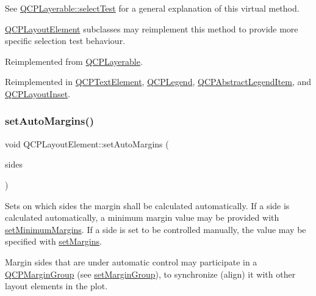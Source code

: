 See \mbox{\hyperlink{class_q_c_p_layerable_a04db8351fefd44cfdb77958e75c6288e}{Q\+C\+P\+Layerable\+::select\+Test}} for a general explanation of this virtual method.

\mbox{\hyperlink{class_q_c_p_layout_element}{Q\+C\+P\+Layout\+Element}} subclasses may reimplement this method to provide more specific selection test behaviour. 

Reimplemented from \mbox{\hyperlink{class_q_c_p_layerable_a04db8351fefd44cfdb77958e75c6288e}{Q\+C\+P\+Layerable}}.



Reimplemented in \mbox{\hyperlink{class_q_c_p_text_element_a1e721bc2994a127ef5a8f0a514a5dbac}{Q\+C\+P\+Text\+Element}}, \mbox{\hyperlink{class_q_c_p_legend_aa53507624491908fb3d1a514b1fc674e}{Q\+C\+P\+Legend}}, \mbox{\hyperlink{class_q_c_p_abstract_legend_item_a80ec112a6608fc39dbed56239849b187}{Q\+C\+P\+Abstract\+Legend\+Item}}, and \mbox{\hyperlink{class_q_c_p_layout_inset_a2eeef7ea1b8340e7c7c2e2fc229df5ea}{Q\+C\+P\+Layout\+Inset}}.

\mbox{\label{class_q_c_p_layout_element_accfda49994e3e6d51ed14504abf9d27d}} 
\subsubsection{\texorpdfstring{set\+Auto\+Margins()}{setAutoMargins()}}
{\footnotesize\ttfamily void Q\+C\+P\+Layout\+Element\+::set\+Auto\+Margins (\begin{DoxyParamCaption}\item[{Q\+C\+P\+::\+Margin\+Sides}]{sides }\end{DoxyParamCaption})}

Sets on which sides the margin shall be calculated automatically. If a side is calculated automatically, a minimum margin value may be provided with \mbox{\hyperlink{class_q_c_p_layout_element_a0a8a17abc16b7923159fcc7608f94673}{set\+Minimum\+Margins}}. If a side is set to be controlled manually, the value may be specified with \mbox{\hyperlink{class_q_c_p_layout_element_a8f450b1f3f992ad576fce2c63d8b79cf}{set\+Margins}}.

Margin sides that are under automatic control may participate in a \mbox{\hyperlink{class_q_c_p_margin_group}{Q\+C\+P\+Margin\+Group}} (see \mbox{\hyperlink{class_q_c_p_layout_element_a516e56f76b6bc100e8e71d329866847d}{set\+Margin\+Group}}), to synchronize (align) it with other layout elements in the plot.

